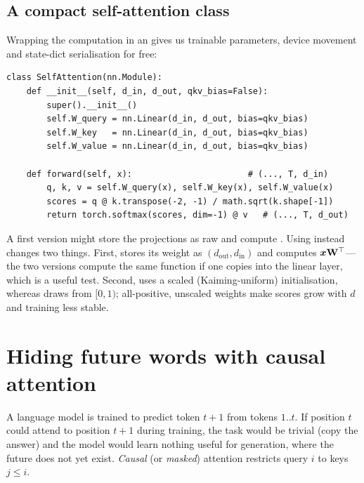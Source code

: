 \subsection{A compact self-attention class}
Wrapping the computation in an  gives us trainable parameters, device movement and
state-dict serialisation for free:

\begin{lstlisting}[caption={Single-head self-attention with trainable projections (Lab 4, Part B).},label={lst:attention:sa}]
class SelfAttention(nn.Module):
    def __init__(self, d_in, d_out, qkv_bias=False):
        super().__init__()
        self.W_query = nn.Linear(d_in, d_out, bias=qkv_bias)
        self.W_key   = nn.Linear(d_in, d_out, bias=qkv_bias)
        self.W_value = nn.Linear(d_in, d_out, bias=qkv_bias)

    def forward(self, x):                       # (..., T, d_in)
        q, k, v = self.W_query(x), self.W_key(x), self.W_value(x)
        scores = q @ k.transpose(-2, -1) / math.sqrt(k.shape[-1])
        return torch.softmax(scores, dim=-1) @ v   # (..., T, d_out)
\end{lstlisting}

A first version might store the projections as raw 
and compute . Using  instead changes two things. First, 
stores its weight as $(d_{\text{out}},d_{\text{in}})$ and computes $\bm{x}\mathbf{W}^\top$---the two
versions compute the same function if one copies  into the linear layer, which is a
useful test. Second,  uses a scaled (Kaiming-uniform) initialisation, whereas
 draws from $[0,1)$; all-positive, unscaled weights make scores grow with $d$ and
training less stable.

\section{Hiding future words with causal attention}\label{sec:attention:causal}

A language model is trained to predict token $t+1$ from tokens $1..t$. If position $t$ could attend
to position $t+1$ during training, the task would be trivial (copy the answer) and the model would
learn nothing useful for generation, where the future does not yet exist. \emph{Causal} (or
\emph{masked}) attention restricts query $i$ to keys $j\le i$.

